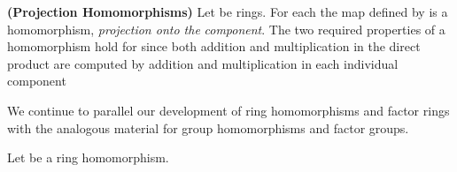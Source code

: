 \documentclass[11pt,oneside]{article}
\begin{document}
\begin{BookBody}

 \textbf{(Projection Homomorphisms)} Let  be rings. For each  the map   defined by  is a homomorphism,\textit{ pro}\textit{jection onto the}  \textit{component}. The two required properties of a homomorphism hold for  since both addition and multiplication in the direct product are computed by addition and multiplication in each individual component\BookEnd{\blacktriangle}


\noindent We continue to parallel our development of ring homomorphisms and factor rings with the analogous material for group homomorphisms and factor groups.

 Let  be a ring homomorphism.









\end{BookBody}
\end{document}
